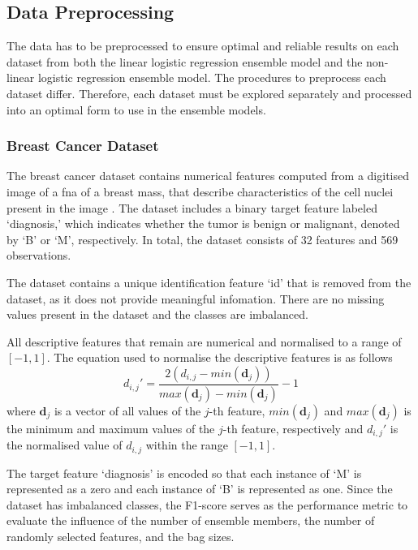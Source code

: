 \documentclass[10pt, conference]{IEEEtran}
\begin{document}
\subsection{Data Preprocessing}

The data has to be preprocessed to ensure optimal and reliable results on each dataset from both the linear
logistic regression ensemble model and the non-linear logistic regression ensemble model.
The procedures to preprocess each dataset differ. Therefore, each dataset must be explored separately and
processed into an optimal form to use in the ensemble models.

\subsubsection{Breast Cancer Dataset}

The breast cancer dataset contains numerical features computed from a digitised image
of a \acrfull{fna} of a breast mass, that describe characteristics of the cell nuclei present in the image \cite{Breast_cancer_ref}.
The dataset includes a binary target feature labeled `diagnosis,' which indicates whether the tumor is
benign or malignant, denoted by `B' or `M', respectively. In total, the dataset consists of 32 features
and 569 observations.

The dataset contains a unique identification feature `id' that is removed from the dataset, as it does not provide
meaningful infomation. There are no missing values present in the dataset and the classes are imbalanced.

All descriptive features that remain are numerical and normalised to a range of $[-1,1]$. The equation used to
normalise the descriptive features is as follows
\begin{equation}
    d_{i,j}' = \frac{2\left(d_{i,j} - min(\textbf{d}_j)\right)}{max(\textbf{d}_j) - min(\textbf{d}_j)} - 1 \label{eq: normalisation}
\end{equation}
where $\textbf{d}_j$ is a vector of all values of the $j$-th feature, $min(\textbf{d}_j)$ and $max(\textbf{d}_j)$
is the minimum and maximum values of the $j$-th feature, respectively and $d_{i,j}'$ is the normalised value
of $d_{i,j}$ within the range $[-1,1]$.

The target feature `diagnosis' is encoded so that each instance of `M' is represented as a zero and each instance
of `B' is represented as one. Since the dataset has imbalanced classes, the F1-score serves as the performance
metric to evaluate the influence of the number of ensemble members, the number of randomly selected features,
and the bag sizes.
\end{document}
